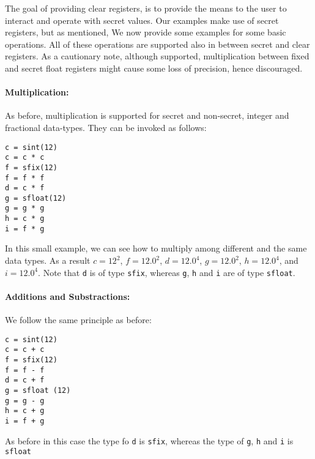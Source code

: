 The goal of providing clear registers, is to provide the means 
to the user to interact and operate with secret values. 
Our examples make use of secret registers, but as mentioned, 
We now provide some examples for some basic operations. 
All of these operations are supported also in between secret and clear registers.
As a cautionary note, although supported, 
multiplication between fixed and secret float registers 
might cause some loss of precision, hence discouraged.

\paragraph{Multiplication:}
As before, multiplication is supported for secret and non-secret, 
integer and fractional data-types. They can be invoked as follows: 

\begin{lstlisting}
c = sint(12)
c = c * c
f = sfix(12)
f = f * f
d = c * f
g = sfloat(12)
g = g * g
h = c * g
i = f * g 
\end{lstlisting}
In this small example, we can see how to multiply among different and the same data types. 
As a result $c=12^2$, $f=12.0^{2}$, $d=12.0^{4}$, $g = 12.0^{2}$, 
$h= 12.0^{4}$, and $i=12.0^{4} $. Note that \verb|d| is of type \verb|sfix|, 
whereas \verb|g|, \verb|h| and \verb|i| are of type \verb|sfloat|.
\\  
\paragraph{Additions and Substractions:}
We follow the same principle as before:
\begin{lstlisting}
c = sint(12)
c = c + c
f = sfix(12)
f = f - f
d = c + f
g = sfloat (12)
g = g - g 
h = c + g
i = f + g
\end{lstlisting}
As before in this case the type fo \verb|d| is \verb|sfix|, 
whereas the type of \verb|g|, \verb|h| and \verb|i| is \verb|sfloat|
\\
